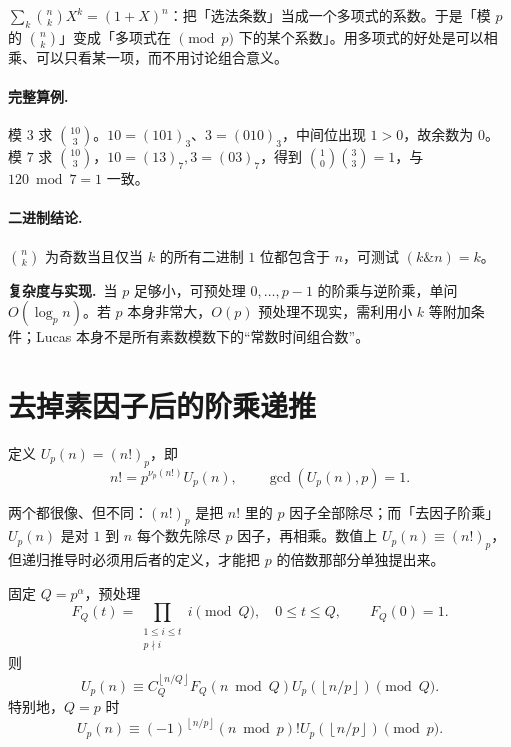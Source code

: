 \documentclass[UTF8,a4paper,11pt,twoside,openright,fontset=fandol]{ctexbook}
\theoremstyle{definition}
\newcommand{\floor}[1]{\left\lfloor #1\right\rfloor}
\newcommand{\cost}{\par\noindent\textbf{复杂度与实现.}\ }
\begin{document}
\begin{tip}
$\sum_k\binom nk X^k=(1+X)^n$：把「选法条数」当成一个多项式的系数。于是「模 $p$ 的 $\binom nk$」变成「多项式在 $\pmod p$ 下的某个系数」。用多项式的好处是可以相乘、可以只看某一项，而不用讨论组合意义。
\end{tip}

\paragraph{完整算例.} 模 $3$ 求 $\binom{10}{3}$。$10=(101)_3$、$3=(010)_3$，中间位出现 $1>0$，故余数为 $0$。模 $7$ 求 $\binom{10}{3}$，$10=(13)_7,3=(03)_7$，得到 $\binom10\binom33=1$，与 $120\bmod7=1$ 一致。
\paragraph{二进制结论.} $\binom nk$ 为奇数当且仅当 $k$ 的所有二进制 $1$ 位都包含于 $n$，可测试 $(k\mathbin{\&}n)=k$。
\cost 当 $p$ 足够小，可预处理 $0,\ldots,p-1$ 的阶乘与逆阶乘，单问 $O(\log_p n)$。若 $p$ 本身非常大，$O(p)$ 预处理不现实，需利用小 $k$ 等附加条件；Lucas 本身不是所有素数模数下的“常数时间组合数”。


\section{去掉素因子后的阶乘递推}
定义 $U_p(n)=(n!)_p$，即
\[
 n!=p^{\nu_p(n!)}U_p(n),\qquad\gcd(U_p(n),p)=1.
\]

\begin{tip}[$(n!)_p$ 与 $U_p(n)$ 的区别]
两个都很像、但不同：$(n!)_p$ 是把 $n!$ 里的 $p$ 因子全部除尽；而「去因子阶乘」$U_p(n)$ 是对 $1$ 到 $n$ 每个数先除尽 $p$ 因子，再相乘。数值上 $U_p(n)\equiv(n!)_p$，但递归推导时必须用后者的定义，才能把 $p$ 的倍数那部分单独提出来。
\end{tip}

固定 $Q=p^\alpha$，预处理
\[
 F_Q(t)=\prod_{\substack{1\le i\le t\\p\nmid i}}i\pmod Q,\quad0\le t\le Q,\qquad F_Q(0)=1.
\]
则
\[
 U_p(n)\equiv C_Q^{\floor{n/Q}}F_Q(n\bmod Q)
 U_p(\floor{n/p})\pmod Q.
\]
特别地，$Q=p$ 时
\[
 U_p(n)\equiv(-1)^{\floor{n/p}}(n\bmod p)!
 U_p(\floor{n/p})\pmod p.
\]
\end{document}
